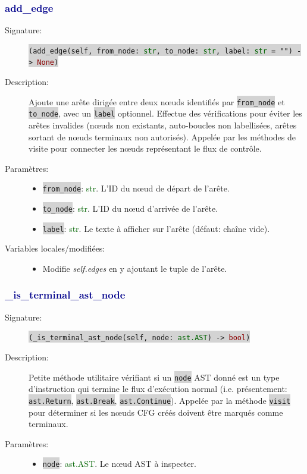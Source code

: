\documentclass[11pt,a4paper]{article}
\newcommand{\code}[1]{\colorbox{lightgray}{\texttt{\small #1}}}
\newcommand{\var}[1]{\textit{#1}}
\newcommand{\vartype}[1]{\textcolor{darkgreen}{#1}}
\newcommand{\methodname}[1]{\textbf{\textcolor{darkblue}{#1}}}
\newcommand{\param}[1]{\code{#1}}
\newcommand{\rettype}[1]{\textcolor{darkred}{#1}}
\begin{document}
\subsubsection*{\methodname{add\_edge}}
\begin{description}
    \item[Signature:] \code{(add\_edge(self, from\_node: \vartype{str}, to\_node: \vartype{str}, label: \vartype{str} = "") -> \rettype{None})}
    \item[Description:] Ajoute une arête dirigée entre deux nœuds identifiés par \param{from\_node} et \param{to\_node}, avec un \param{label} optionnel. Effectue des vérifications pour éviter les arêtes invalides (nœuds non existants, auto-boucles non labellisées, arêtes sortant de nœuds terminaux non autorisés). Appelée par les méthodes de visite pour connecter les nœuds représentant le flux de contrôle.
    \item[Paramètres:]
    \begin{itemize}
        \item \param{from\_node}: \vartype{str}. L'ID du nœud de départ de l'arête.
        \item \param{to\_node}: \vartype{str}. L'ID du nœud d'arrivée de l'arête.
        \item \param{label}: \vartype{str}. Le texte à afficher sur l'arête (défaut: chaîne vide).
    \end{itemize}
    \item[Variables locales/modifiées:]
    \begin{itemize}
        \item Modifie \var{self.edges} en y ajoutant le tuple de l'arête.
    \end{itemize}
\end{description}

\subsubsection*{\methodname{\_is\_terminal\_ast\_node}}
\begin{description}
    \item[Signature:] \code{(\_is\_terminal\_ast\_node(self, node: \vartype{ast.AST}) -> \rettype{bool})}
    \item[Description:] Petite méthode utilitaire vérifiant si un \code{node} AST donné est un type d'instruction qui termine le flux d'exécution normal (i.e. présentement: \code{ast.Return}, \code{ast.Break}, \code{ast.Continue}). Appelée par la méthode \code{visit} pour déterminer si les nœuds CFG créés doivent être marqués comme terminaux.
    \item[Paramètres:]
    \begin{itemize}
        \item \param{node}: \vartype{ast.AST}. Le nœud AST à inspecter.
    \end{itemize}
\end{description}
\end{document}
